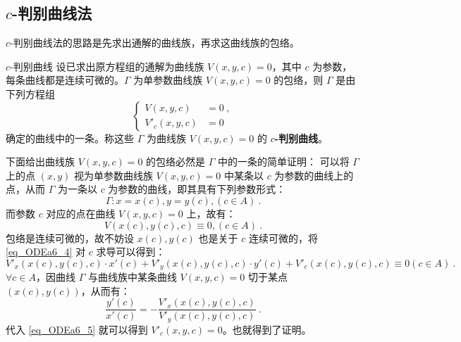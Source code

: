 \subsection{$c$-判别曲线法}\label{sub_ODEa6_2}
$c$-判别曲线法的思路是先求出通解的曲线族，再求这曲线族的包络。
\begin{definition}{$c$-判别曲线}
设已求出原方程组的通解为曲线族 $V(x,y,c)=0$，其中 $c$ 为参数，每条曲线都是连续可微的。$\Gamma$ 为单参数曲线族 $V(x,y,c)=0$ 的包络，则 $\Gamma$ 是由下列方程组
\begin{equation}\label{eq_ODEa6_3}
\left \{
\begin{aligned}
V(x,y,c) &= 0~,\\
V'_c(x,y,c) &= 0~
\end{aligned}
\right .
\end{equation}
确定的曲线中的一条。称这些 $\Gamma$ 为曲线族 $V(x,y,c)=0$ 的 \textbf{$c$-判别曲线}。
\end{definition}
下面给出曲线族 $V(x,y,c)=0$ 的包络必然是 $\Gamma$ 中的一条的简单证明：
可以将 $\Gamma$ 上的点 $(x, y)$ 视为单参数曲线族 $V(x,y,c)=0$ 中某条以 $c$ 为参数的曲线上的点，从而 $\Gamma$ 为一条以 $c$ 为参数的曲线，即其具有下列参数形式：
\begin{equation}
\Gamma: x=x(c), y=y(c), (c \in A) ~.
\end{equation}
而参数 $c$ 对应的点在曲线 $V(x,y,c)=0$ 上，故有：
\begin{equation}\label{eq_ODEa6_4}
V(x(c), y(c), c) \equiv 0, (c \in A) ~.
\end{equation}
包络是连续可微的，故不妨设 $x(c), y(c)$ 也是关于 $c$ 连续可微的，将 \autoref{eq_ODEa6_4} 对 $c$ 求导可以得到：
\begin{equation}\label{eq_ODEa6_5}
V'_x(x(c), y(c), c) \cdot x'(c) + V'_y(x(c), y(c), c) \cdot y'(c) + V'_c(x(c), y(c), c) \equiv 0 (c \in A)~.
\end{equation}
$\forall c \in A$，因曲线 $\Gamma$ 与曲线族中某条曲线 $V(x,y,c)=0$ 切于某点 $(x(c), y(c))$，从而有：
\begin{equation}\label{eq_ODEa6_6}
\frac{y'(c)}{x'(c)} = -\frac{V'_x(x(c), y(c), c)}{V'_y(x(c), y(c), c)} ~.
\end{equation}
代入 \autoref{eq_ODEa6_5} 就可以得到 $V'_c(x, y, c)=0$。也就得到了证明。

